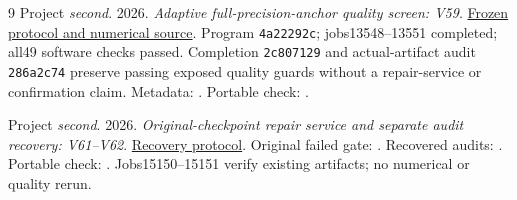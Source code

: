 \documentclass[10pt,twocolumn,letterpaper]{article}
\begin{document}
\begin{thebibliography}{9}
Project \emph{second}. 2026. \emph{Adaptive full-precision-anchor quality screen: V59}.
\href{https://github.com/priyankjairaj100/second/blob/60a514098511526924cb5746a2a61851b5f6bd23/research_v59/PROTOCOL.txt}{Frozen protocol and numerical source}.
Program \texttt{4a22292c}; jobs13548--13551 completed; all49 software checks passed.
Completion \texttt{2c807129} and actual-artifact audit \texttt{286a2c74} preserve
passing exposed quality guards without a repair-service or confirmation claim.
Metadata: .
Portable check: .

Project \emph{second}. 2026. \emph{Original-checkpoint repair service and separate
audit recovery: V61--V62}.
\href{https://github.com/priyankjairaj100/second/blob/codex/second-cluster-v42/research_v62/PROTOCOL.txt}{Recovery protocol}.
Original failed gate: .
Recovered audits: .
Portable check: .
Jobs15150--15151 verify existing artifacts; no numerical or quality rerun.

\end{thebibliography}
\end{document}
